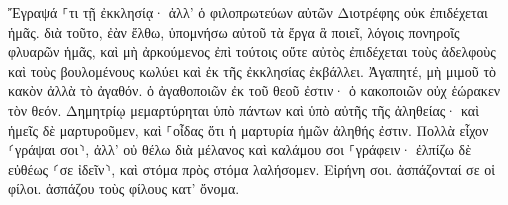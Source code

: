\documentclass{openreader}
\begin{document}
Ἔγραψά ⸀τι τῇ ἐκκλησίᾳ· ἀλλ’ ὁ φιλοπρωτεύων αὐτῶν Διοτρέφης οὐκ ἐπιδέχεται ἡμᾶς. 
διὰ τοῦτο, ἐὰν ἔλθω, ὑπομνήσω αὐτοῦ τὰ ἔργα ἃ ποιεῖ, λόγοις πονηροῖς φλυαρῶν ἡμᾶς, καὶ μὴ ἀρκούμενος ἐπὶ τούτοις οὔτε αὐτὸς ἐπιδέχεται τοὺς ἀδελφοὺς καὶ τοὺς βουλομένους κωλύει καὶ ἐκ τῆς ἐκκλησίας ἐκβάλλει. 
Ἀγαπητέ, μὴ μιμοῦ τὸ κακὸν ἀλλὰ τὸ ἀγαθόν. ὁ ἀγαθοποιῶν ἐκ τοῦ θεοῦ ἐστιν· ὁ κακοποιῶν οὐχ ἑώρακεν τὸν θεόν. 
Δημητρίῳ μεμαρτύρηται ὑπὸ πάντων καὶ ὑπὸ αὐτῆς τῆς ἀληθείας· καὶ ἡμεῖς δὲ μαρτυροῦμεν, καὶ ⸀οἶδας ὅτι ἡ μαρτυρία ἡμῶν ἀληθής ἐστιν. 
Πολλὰ εἶχον ⸂γράψαι σοι⸃, ἀλλ’ οὐ θέλω διὰ μέλανος καὶ καλάμου σοι ⸀γράφειν· 
ἐλπίζω δὲ εὐθέως ⸂σε ἰδεῖν⸃, καὶ στόμα πρὸς στόμα λαλήσομεν. 
Εἰρήνη σοι. ἀσπάζονταί σε οἱ φίλοι. ἀσπάζου τοὺς φίλους κατ’ ὄνομα. 
\end{document}
